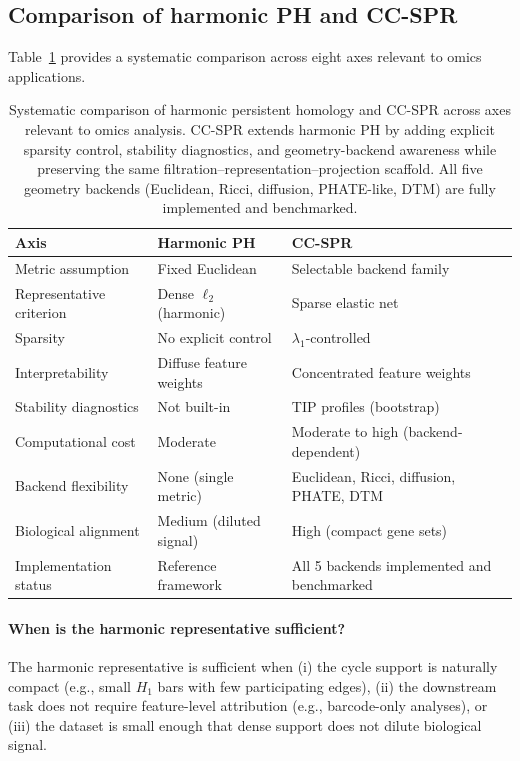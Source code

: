 \documentclass[11pt]{article}
\begin{document}
\subsection{Comparison of harmonic PH and CC-SPR}

Table~\ref{tab:hphcompare} provides a systematic comparison across eight axes relevant to omics applications.

\begin{table}[h]
\centering
\small
\begin{tabular}{p{2.5cm}p{3.0cm}p{3.0cm}}
\toprule
\textbf{Axis} & \textbf{Harmonic PH} & \textbf{CC-SPR} \\
\midrule
Metric assumption & Fixed Euclidean & Selectable backend family \\
Representative criterion & Dense $\ell_2$ (harmonic) & Sparse elastic net \\
Sparsity & No explicit control & $\lambda_1$-controlled \\
Interpretability & Diffuse feature weights & Concentrated feature weights \\
Stability diagnostics & Not built-in & TIP profiles (bootstrap) \\
Computational cost & Moderate & Moderate to high (backend-dependent) \\
Backend flexibility & None (single metric) & Euclidean, Ricci, diffusion, PHATE, DTM \\
Biological alignment & Medium (diluted signal) & High (compact gene sets) \\
Implementation status & Reference framework & All 5 backends implemented and benchmarked \\
\bottomrule
\end{tabular}
\caption{Systematic comparison of harmonic persistent homology and CC-SPR across axes relevant to omics analysis.
CC-SPR extends harmonic PH by adding explicit sparsity control, stability diagnostics, and geometry-backend awareness while preserving the same filtration--representation--projection scaffold.
All five geometry backends (Euclidean, Ricci, diffusion, PHATE-like, DTM) are fully implemented and benchmarked.}
\label{tab:hphcompare}
\end{table}

\paragraph{When is the harmonic representative sufficient?}
The harmonic representative is sufficient when (i) the cycle support is naturally compact (e.g., small $H_1$ bars with few participating edges), (ii) the downstream task does not require feature-level attribution (e.g., barcode-only analyses), or (iii) the dataset is small enough that dense support does not dilute biological signal.
\end{document}
